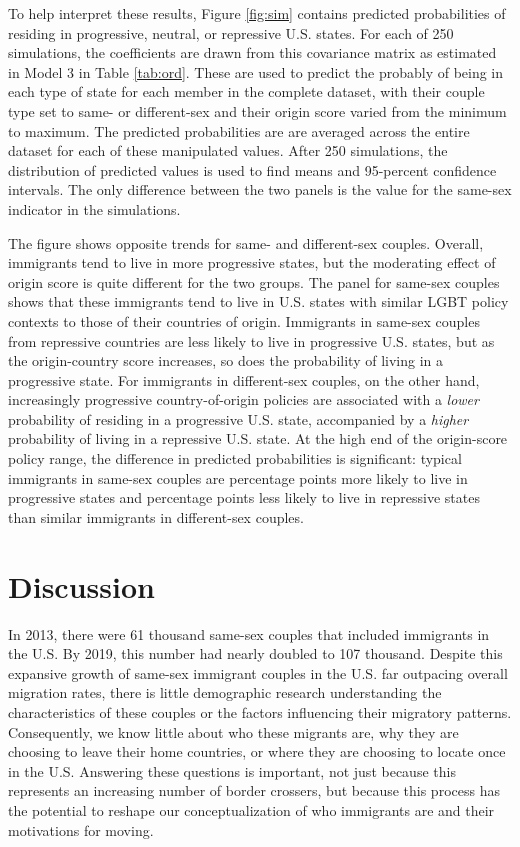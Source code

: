 \documentclass[
  11pt,
]{article}
\begin{document}
To help interpret these results, Figure \ref{fig:sim} contains predicted probabilities of residing in progressive, neutral, or repressive U.S. states. For each of 250 simulations, the coefficients are drawn from this covariance matrix as estimated in Model 3 in Table \ref{tab:ord}. These are used to predict the probably of being in each type of state for each member in the complete dataset, with their couple type set to same- or different-sex and their origin score varied from the minimum to maximum. The predicted probabilities are are averaged across the entire dataset for each of these manipulated values. After 250 simulations, the distribution of predicted values is used to find means and 95-percent confidence intervals. The only difference between the two panels is the value for the same-sex indicator in the simulations.

The figure shows opposite trends for same- and different-sex couples. Overall, immigrants tend to live in more progressive states, but the moderating effect of origin score is quite different for the two groups. The panel for same-sex couples shows that these immigrants tend to live in U.S. states with similar LGBT policy contexts to those of their countries of origin. Immigrants in same-sex couples from repressive countries are less likely to live in progressive U.S. states, but as the origin-country score increases, so does the probability of living in a progressive state. For immigrants in different-sex couples, on the other hand, increasingly progressive country-of-origin policies are associated with a \emph{lower} probability of residing in a progressive U.S. state, accompanied by a \emph{higher} probability of living in a repressive U.S. state. At the high end of the origin-score policy range, the difference in predicted probabilities is significant: typical immigrants in same-sex couples are percentage points more likely to live in progressive states and percentage points less likely to live in repressive states than similar immigrants in different-sex couples.

\hypertarget{discussion}{%
\section{Discussion}\label{discussion}}

In 2013, there were 61 thousand same-sex couples that included immigrants in the U.S. By 2019, this number had nearly doubled to 107 thousand. Despite this expansive growth of same-sex immigrant couples in the U.S. far outpacing overall migration rates, there is little demographic research understanding the characteristics of these couples or the factors influencing their migratory patterns. Consequently, we know little about who these migrants are, why they are choosing to leave their home countries, or where they are choosing to locate once in the U.S. Answering these questions is important, not just because this represents an increasing number of border crossers, but because this process has the potential to reshape our conceptualization of who immigrants are and their motivations for moving.
\end{document}
